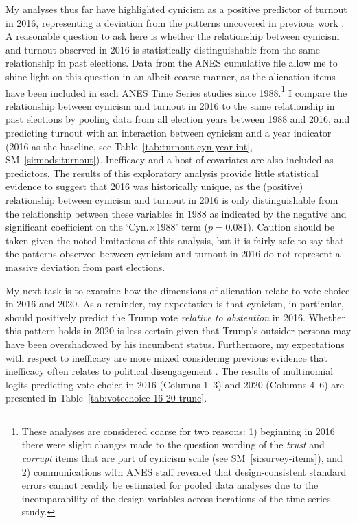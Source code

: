 \documentclass[12pt]{article}
\begin{document}
My analyses thus far have highlighted cynicism as a positive predictor of turnout in 2016, representing a deviation from the patterns uncovered in previous work \parencite{southwell1998electoral}. A reasonable question to ask here is whether the relationship between cynicism and turnout observed in 2016 is statistically distinguishable from the same relationship in past elections. Data from the ANES cumulative file allow me to shine light on this question in an albeit coarse manner, as the alienation items have been included in each ANES Time Series studies since 1988.\footnote{These analyses are considered coarse for two reasons: 1) beginning in 2016 there were slight changes made to the question wording of the \textit{trust} and \textit{corrupt} items that are part of cynicism scale (see SM~\ref{si:survey-items}), and 2) communications with ANES staff revealed that design-consistent standard errors cannot readily be estimated for pooled data analyses due to the incomparability of the design variables across iterations of the time series study.} I compare the relationship between cynicism and turnout in 2016 to the same relationship in past elections by pooling data from all election years between 1988 and 2016, and predicting turnout with an interaction between cynicism and a year indicator (2016 as the baseline, see Table~\ref{tab:turnout-cyn-year-int}, SM~\ref{si:mods:turnout}). Inefficacy and a host of covariates are also included as predictors. The results of this exploratory analysis provide little statistical evidence to suggest that 2016 was historically unique, as the (positive) relationship between cynicism and turnout in 2016 is only distinguishable from the relationship between these variables in 1988 as indicated by the negative and significant coefficient on the `Cyn.$\times$1988' term ($p = 0.081$). Caution should be taken given the noted limitations of this analysis, but it is fairly safe to say that the patterns observed between cynicism and turnout in 2016 do not represent a massive deviation from past elections. 

My next task is to examine how the dimensions of alienation relate to vote choice in 2016 and 2020. As a reminder, my expectation is that cynicism, in particular, should positively predict the Trump vote \textit{relative to abstention} in 2016. Whether this pattern holds in 2020 is less certain given that Trump's outsider persona may have been overshadowed by his incumbent status. Furthermore, my expectations with respect to inefficacy are more mixed considering previous evidence that inefficacy often relates to political disengagement \parencite{aberbach1969alienation}. The results of multinomial logits predicting vote choice in 2016 (Columns 1--3) and 2020 (Columns 4--6) are presented in Table~\ref{tab:votechoice-16-20-trunc}.
\end{document}
